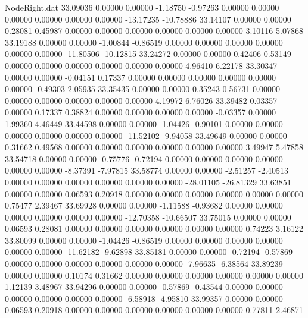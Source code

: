 \begin{filecontents}{NodeRight.dat}
  33.09036    0.00000    0.00000    -1.18750   -0.97263    0.00000    0.00000    0.00000    0.00000    0.00000    0.00000  -13.17235  -10.78886
  33.14107    0.00000    0.00000     0.28081    0.45987    0.00000    0.00000    0.00000    0.00000    0.00000    0.00000    3.10116    5.07868
  33.19188    0.00000    0.00000    -1.00844   -0.86519    0.00000    0.00000    0.00000    0.00000    0.00000    0.00000  -11.80506  -10.12815
  33.24272    0.00000    0.00000     0.42406    0.53149    0.00000    0.00000    0.00000    0.00000    0.00000    0.00000    4.96410    6.22178
  33.30347    0.00000    0.00000    -0.04151    0.17337    0.00000    0.00000    0.00000    0.00000    0.00000    0.00000   -0.49303    2.05935
  33.35435    0.00000    0.00000     0.35243    0.56731    0.00000    0.00000    0.00000    0.00000    0.00000    0.00000    4.19972    6.76026
  33.39482    0.03357    0.00000     0.17337    0.38824    0.00000    0.00000    0.00000    0.00000   -0.03357    0.00000    1.99360    4.46449
  33.44598    0.00000    0.00000    -1.04426   -0.90101    0.00000    0.00000    0.00000    0.00000    0.00000    0.00000  -11.52102   -9.94058
  33.49649    0.00000    0.00000     0.31662    0.49568    0.00000    0.00000    0.00000    0.00000    0.00000    0.00000    3.49947    5.47858
  33.54718    0.00000    0.00000    -0.75776   -0.72194    0.00000    0.00000    0.00000    0.00000    0.00000    0.00000   -8.37391   -7.97815
  33.58774    0.00000    0.00000    -2.51257   -2.40513    0.00000    0.00000    0.00000    0.00000    0.00000    0.00000  -28.01105  -26.81329
  33.63851    0.00000    0.00000     0.06593    0.20918    0.00000    0.00000    0.00000    0.00000    0.00000    0.00000    0.75477    2.39467
  33.69928    0.00000    0.00000    -1.11588   -0.93682    0.00000    0.00000    0.00000    0.00000    0.00000    0.00000  -12.70358  -10.66507
  33.75015    0.00000    0.00000     0.06593    0.28081    0.00000    0.00000    0.00000    0.00000    0.00000    0.00000    0.74223    3.16122
  33.80099    0.00000    0.00000    -1.04426   -0.86519    0.00000    0.00000    0.00000    0.00000    0.00000    0.00000  -11.62182   -9.62898
  33.85181    0.00000    0.00000    -0.72194   -0.57869    0.00000    0.00000    0.00000    0.00000    0.00000    0.00000   -7.96635   -6.38564
  33.89239    0.00000    0.00000     0.10174    0.31662    0.00000    0.00000    0.00000    0.00000    0.00000    0.00000    1.12139    3.48967
  33.94296    0.00000    0.00000    -0.57869   -0.43544    0.00000    0.00000    0.00000    0.00000    0.00000    0.00000   -6.58918   -4.95810
  33.99357    0.00000    0.00000     0.06593    0.20918    0.00000    0.00000    0.00000    0.00000    0.00000    0.00000    0.77811    2.46871

\end{filecontents}

